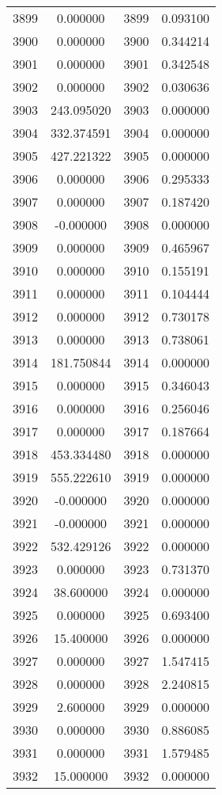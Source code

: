 \documentclass[12pt]{article}
\begin{document}
\begin{longtable}{@{}cccc@{}}
3899 & 0.000000 & 3899 & 0.093100 \\
3900 & 0.000000 & 3900 & 0.344214 \\
3901 & 0.000000 & 3901 & 0.342548 \\
3902 & 0.000000 & 3902 & 0.030636 \\
3903 & 243.095020 & 3903 & 0.000000 \\
3904 & 332.374591 & 3904 & 0.000000 \\
3905 & 427.221322 & 3905 & 0.000000 \\
3906 & 0.000000 & 3906 & 0.295333 \\
3907 & 0.000000 & 3907 & 0.187420 \\
3908 & -0.000000 & 3908 & 0.000000 \\
3909 & 0.000000 & 3909 & 0.465967 \\
3910 & 0.000000 & 3910 & 0.155191 \\
3911 & 0.000000 & 3911 & 0.104444 \\
3912 & 0.000000 & 3912 & 0.730178 \\
3913 & 0.000000 & 3913 & 0.738061 \\
3914 & 181.750844 & 3914 & 0.000000 \\
3915 & 0.000000 & 3915 & 0.346043 \\
3916 & 0.000000 & 3916 & 0.256046 \\
3917 & 0.000000 & 3917 & 0.187664 \\
3918 & 453.334480 & 3918 & 0.000000 \\
3919 & 555.222610 & 3919 & 0.000000 \\
3920 & -0.000000 & 3920 & 0.000000 \\
3921 & -0.000000 & 3921 & 0.000000 \\
3922 & 532.429126 & 3922 & 0.000000 \\
3923 & 0.000000 & 3923 & 0.731370 \\
3924 & 38.600000 & 3924 & 0.000000 \\
3925 & 0.000000 & 3925 & 0.693400 \\
3926 & 15.400000 & 3926 & 0.000000 \\
3927 & 0.000000 & 3927 & 1.547415 \\
3928 & 0.000000 & 3928 & 2.240815 \\
3929 & 2.600000 & 3929 & 0.000000 \\
3930 & 0.000000 & 3930 & 0.886085 \\
3931 & 0.000000 & 3931 & 1.579485 \\
3932 & 15.000000 & 3932 & 0.000000 \\

\end{longtable}
\end{document}
